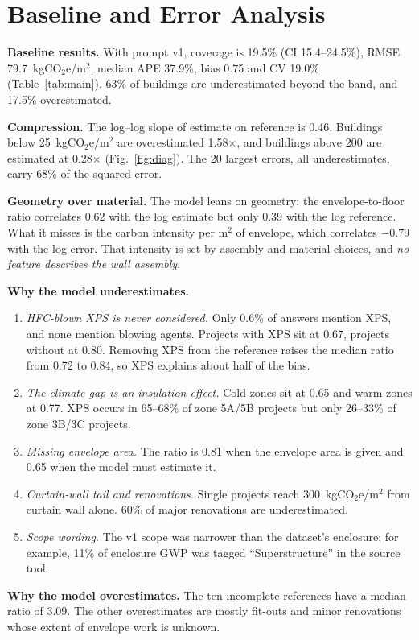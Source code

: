\documentclass[10pt,letterpaper]{article}
\newcommand{\coe}{kgCO$_2$e/m$^2$}
\begin{document}
\section{Baseline and Error Analysis}
\label{sec:error}
\textbf{Baseline results.} With prompt v1, coverage is 19.5\% (CI 15.4--24.5\%), RMSE 79.7~\coe{}, median APE 37.9\%, bias 0.75 and CV 19.0\% (Table~\ref{tab:main}). 63\% of buildings are underestimated beyond the band, and 17.5\% overestimated.

\textbf{Compression.} The log--log slope of estimate on reference is 0.46. Buildings below 25~\coe{} are overestimated 1.58$\times$, and buildings above 200 are estimated at 0.28$\times$ (Fig.~\ref{fig:diag}). The 20 largest errors, all underestimates, carry 68\% of the squared error.

\textbf{Geometry over material.} The model leans on geometry: the envelope-to-floor ratio correlates 0.62 with the log estimate but only 0.39 with the log reference. What it misses is the carbon intensity per m$^2$ of envelope, which correlates $-0.79$ with the log error. That intensity is set by assembly and material choices, and \emph{no feature describes the wall assembly}.

\textbf{Why the model underestimates.}
\begin{enumerate}
\item \emph{HFC-blown XPS is never considered.} Only 0.6\% of answers mention XPS, and none mention blowing agents. Projects with XPS sit at 0.67, projects without at 0.80. Removing XPS from the reference raises the median ratio from 0.72 to 0.84, so XPS explains about half of the bias.
\item \emph{The climate gap is an insulation effect.} Cold zones sit at 0.65 and warm zones at 0.77. XPS occurs in 65--68\% of zone 5A/5B projects but only 26--33\% of zone 3B/3C projects.
\item \emph{Missing envelope area.} The ratio is 0.81 when the envelope area is given and 0.65 when the model must estimate it.
\item \emph{Curtain-wall tail and renovations.} Single projects reach 300~\coe{} from curtain wall alone. 60\% of major renovations are underestimated.
\item \emph{Scope wording.} The v1 scope was narrower than the dataset's enclosure; for example, 11\% of enclosure GWP was tagged ``Superstructure'' in the source tool.
\end{enumerate}

\textbf{Why the model overestimates.} The ten incomplete references have a median ratio of 3.09. The other overestimates are mostly fit-outs and minor renovations whose extent of envelope work is unknown.
\end{document}
